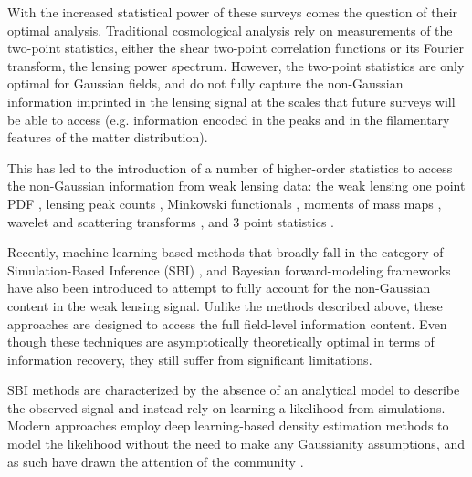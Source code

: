 \documentclass[twocolumn,twocolappendix]{aastex63}
\begin{document}
With the increased statistical power of these surveys comes the question of their optimal analysis. Traditional cosmological analysis rely on measurements of the two-point statistics, either the shear two-point correlation functions or its Fourier transform, the lensing power spectrum. However, the two-point statistics are only optimal for Gaussian fields, and do not fully capture the non-Gaussian information imprinted in the lensing signal at the scales that future surveys will be able to access (e.g. information encoded in the peaks and in the filamentary features of the matter distribution).

 This has led to the introduction of a number of  higher-order statistics to access the non-Gaussian information from weak lensing data: 
the weak lensing one point PDF \citep{liu2019constraining, uhlemann2020fisher, boyle2021nuw}, lensing peak counts \citep{liu2015cosmology, liu2015cosmological, lin2015new, kacprzak2016cosmology, peel2017cosmological, shan2018kids, martinet2018kids, ajani2020constraining, harnois2021cosmic, zurcher2022dark}, Minkowski functionals \citep{kratochvil2012probing, petri2013cosmology}, moments of mass maps \citep{gatti2021dark}, wavelet and scattering transforms \citep{ajani2021starlet, cheng2021weak}, and 3 point statistics \citep{takada2004cosmological, semboloni2011weak, rizzato2019tomographic, halder2021integrated}. 


Recently, machine learning-based methods that broadly fall in the category of Simulation-Based Inference (SBI) \citep{fluri2019cosmological, kacprzak2022deeplss, fluri2021cosmological, jeffrey2021likelihood, fluri2022full}, and Bayesian forward-modeling frameworks \citep{porqueres2021bayesian, sarma2022map} have also been introduced to attempt to fully account for the non-Gaussian content in the weak lensing signal. Unlike the methods described above, these approaches are designed to access the full field-level information content. Even though these techniques are asymptotically theoretically optimal in terms of information recovery, they still suffer from significant limitations.

SBI methods are characterized by the absence of an analytical model to describe the observed signal and instead rely on learning a likelihood from simulations. Modern approaches employ deep learning-based density estimation methods to model the likelihood without the need to make any Gaussianity assumptions, and as such have 
drawn the attention of the community \citep{alsing2018massive, jeffrey2021likelihood}.  
\end{document}
